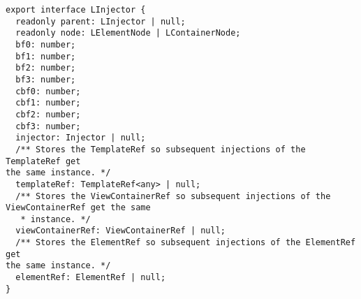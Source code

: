 \begin{verbatim}
export interface LInjector {
  readonly parent: LInjector | null;
  readonly node: LElementNode | LContainerNode;
  bf0: number;
  bf1: number;
  bf2: number;
  bf3: number;
  cbf0: number;
  cbf1: number;
  cbf2: number;
  cbf3: number;
  injector: Injector | null;
  /** Stores the TemplateRef so subsequent injections of the TemplateRef get
the same instance. */
  templateRef: TemplateRef<any> | null;
  /** Stores the ViewContainerRef so subsequent injections of the
ViewContainerRef get the same
   * instance. */
  viewContainerRef: ViewContainerRef | null;
  /** Stores the ElementRef so subsequent injections of the ElementRef get
the same instance. */
  elementRef: ElementRef | null;
}
\end{verbatim}
